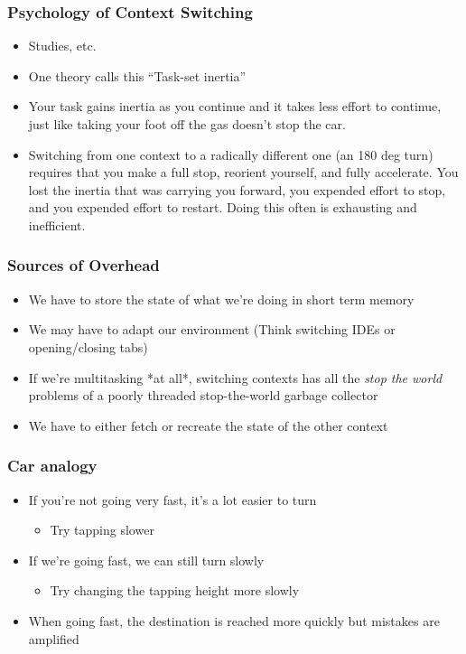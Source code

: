 \documentclass{beamer}
\begin{document}
\begin{frame}
\frametitle{Psychology of Context Switching}
\begin{itemize}
  \item Studies, etc.
  \item One theory calls this ``Task-set inertia''
  \item Your task gains inertia as you continue and it takes less effort to continue, just like taking your foot off the gas doesn't stop the car.
  \item Switching from one context to a radically different one (an 180 deg turn) requires that you make a full stop, reorient yourself, and fully accelerate. You lost the inertia that was carrying you forward, you expended effort to stop, and you expended effort to restart. Doing this often is exhausting and inefficient.
\end{itemize}
\end{frame}


\begin{frame}
\frametitle{Sources of Overhead}
\begin{itemize}
  \item We have to store the state of what we're doing in short term memory
  \item We may have to adapt our environment (Think switching IDEs or opening/closing tabs)
  \item If we're multitasking *at all*, switching contexts has all the \textit{stop the world} problems of a poorly threaded stop-the-world garbage collector
  \item We have to either fetch or recreate the state of the other context
\end{itemize}
\end{frame}


\begin{frame}
\frametitle{Car analogy}
  \begin{itemize}
    \item If you're not going very fast, it's a lot easier to turn
    \begin{itemize}
      \item Try tapping slower
    \end{itemize}
    \item If we're going fast, we can still turn slowly
    \begin{itemize}
      \item Try changing the tapping height more slowly
    \end{itemize}
    \item When going fast, the destination is reached more quickly but mistakes are amplified
  \end{itemize}
\end{frame}
\end{document}
